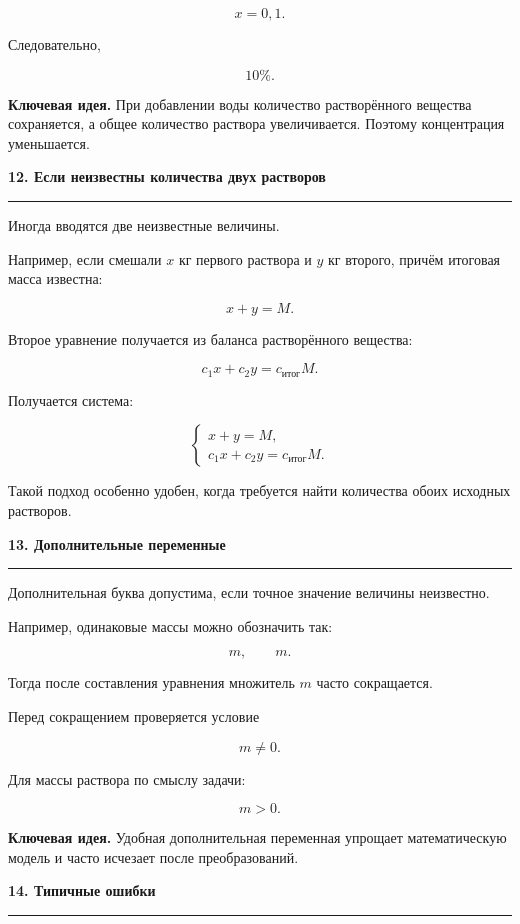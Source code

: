 \documentclass[a4paper,12pt]{article}
\newcommand{\topic}[1]{%
    \vspace{0.5em}
    {\Large\bfseries\color{darkaccent}#1}\par
    \vspace{0.25em}
    {\color{accent!55}\rule{\linewidth}{0.6pt}}\par
    \vspace{0.45em}
}
\newcommand{\keyidea}[1]{%
    \textbf{\color{darkaccent}Ключевая идея.} #1
}
\begin{document}
\[
x=0{,}1.
\]

Следовательно,

\[
\boxed{10\%}.
\]

\keyidea{При добавлении воды количество растворённого вещества сохраняется, а общее количество раствора увеличивается. Поэтому концентрация уменьшается.}


\topic{12. Если неизвестны количества двух растворов}

Иногда вводятся две неизвестные величины.

Например, если смешали $x$ кг первого раствора и $y$ кг второго, причём итоговая масса известна:

\[
\boxed{x+y=M}.
\]

Второе уравнение получается из баланса растворённого вещества:

\[
\boxed{
c_1x+c_2y=c_{\text{итог}}M
}.
\]

Получается система:

\[
\begin{cases}
x+y=M,\\
c_1x+c_2y=c_{\text{итог}}M.
\end{cases}
\]

Такой подход особенно удобен, когда требуется найти количества обоих исходных растворов.


\topic{13. Дополнительные переменные}

Дополнительная буква допустима, если точное значение величины неизвестно.

Например, одинаковые массы можно обозначить так:

\[
m,\qquad m.
\]

Тогда после составления уравнения множитель $m$ часто сокращается.

Перед сокращением проверяется условие

\[
m\ne0.
\]

Для массы раствора по смыслу задачи:

\[
m>0.
\]

\keyidea{Удобная дополнительная переменная упрощает математическую модель и часто исчезает после преобразований.}


\topic{14. Типичные ошибки}
\end{document}
